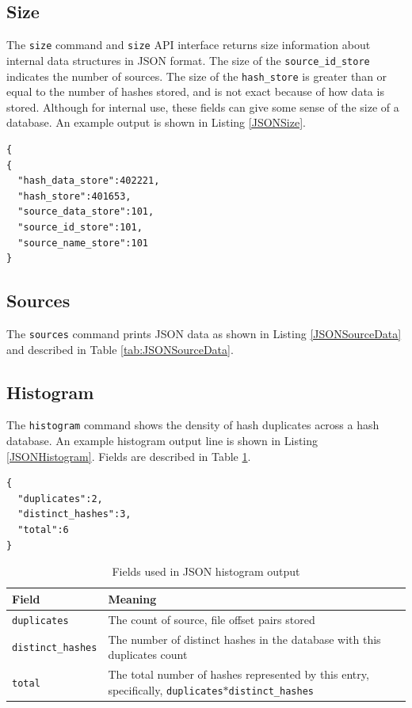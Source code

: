 \documentclass[11pt,fleqn]{article} %
\begin{document}
\subsection{Size}
The \hdb \verb+size+ command and \verb+size+ API interface returns size information about internal data structures in JSON format. The size of the \verb+source_id_store+ indicates the number of sources. The size of the \verb+hash_store+ is greater than or equal to the number of hashes stored, and is not exact because of how data is stored. Although for internal use, these fields can give some sense of the size of a \hdb database. An example output is shown in Listing \ref{JSONSize}.\\

\lstset{style=customfile}
\begin{lstlisting}[float, caption={Example JSON output of database size values}, label=JSONSize]
{
{
  "hash_data_store":402221,
  "hash_store":401653,
  "source_data_store":101,
  "source_id_store":101,
  "source_name_store":101
}
\end{lstlisting}

\subsection{Sources}
The \verb+sources+ command prints JSON data as shown in Listing \ref{JSONSourceData} and described in Table \ref{tab:JSONSourceData}.\\

\subsection{Histogram}
The \verb+histogram+ command shows the density of hash duplicates across a hash database.  An example histogram output line is shown in Listing \ref{JSONHistogram}.  Fields are described in Table \ref{tab:JSONHistogram}.\\

\lstset{style=customfile}
\begin{lstlisting}[caption={Example JSON histogram format}, label=JSONHistogram]
{
  "duplicates":2,
  "distinct_hashes":3,
  "total":6
}
\end{lstlisting}

\begin{table}[!ht]

\centering
\caption{Fields used in JSON histogram output}
\label{tab:JSONHistogram}
\begin{tabular}{|p{5 cm}|p{8.8 cm}|}
\hline \hline
\textbf{Field} & \textbf{Meaning} \\
\hline
\verb+duplicates+ & The count of source, file offset pairs stored\\
\hline
\verb+distinct_hashes+ & The number of distinct hashes in the database with this duplicates count\\
\hline
\verb+total+ & The total number of hashes represented by this entry, specifically, \verb+duplicates+$*$\verb+distinct_hashes+\\
\hline
\end{tabular}
\end{table}
\end{document}
